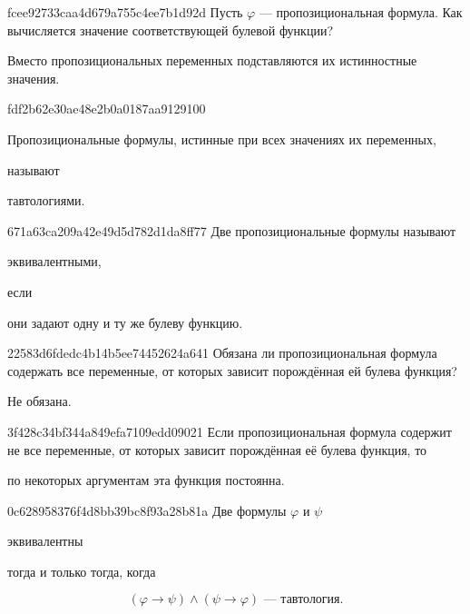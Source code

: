 \begin{note}{fcee92733caa4d679a755c4ee7b1d92d}
    Пусть \({ \varphi }\) --- пропозициональная формула.
    Как вычисляется значение соответствующей булевой функции?

    \begin{cloze}{1}
        Вместо пропозициональных переменных подставляются их истинностные значения.
    \end{cloze}
\end{note}

\begin{note}{fdf2b62e30ae48e2b0a0187aa9129100}
    \begin{icloze}{2}Пропозициональные формулы, истинные при всех значениях их переменных,\end{icloze} называют \begin{icloze}{1}тавтологиями.\end{icloze}
\end{note}

\begin{note}{671a63ca209a42e49d5d782d1da8ff77}
    Две пропозициональные формулы называют \begin{icloze}{2}эквивалентными,\end{icloze} если \begin{icloze}{1}они задают одну и ту же булеву функцию.\end{icloze}
\end{note}

\begin{note}{22583d6fdedc4b14b5ee74452624a641}
    Обязана ли пропозициональная формула содержать все переменные, от которых зависит порождённая ей булева функция?

    \begin{cloze}{1}
        Не обязана.
    \end{cloze}
\end{note}

\begin{note}{3f428c34bf344a849efa7109edd09021}
    Если пропозициональная формула содержит не все переменные, от которых зависит порождённая её булева функция, то \begin{icloze}{1}по некоторых аргументам эта функция постоянна.\end{icloze}
\end{note}

\begin{note}{0c628958376f4d8bb39bc8f93a28b81a}
    Две формулы \({ \varphi }\) и \({ \psi }\) \begin{icloze}{2}эквивалентны\end{icloze} тогда и только тогда, когда
    \begin{icloze}{1}
        \[
            (\varphi \to \psi) \land (\psi \to \varphi) \text{ --- тавтология}.
        \]
    \end{icloze}
\end{note}

